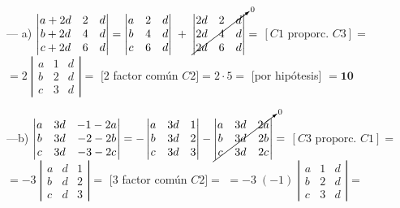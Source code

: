 \begin{proofw}\renewcommand{\qedsymbol}{$\diamond$}

--- a) $\left| \begin{matrix} a+2d&2&d\\b+2d&4&d\\c+2d&6&d  \end{matrix} \right|=\left| \begin{matrix} a&2&d\\b&4&d\\c&6&d  \end{matrix} \right|\;    + \; \cancelto{0}{ \left| \begin{matrix} 2d&2&d\\2d&4&d\\2d&6&d  \end{matrix} \right|}= $
\small{$[C1 \text{ proporc. } C3 ]$}\normalsize{$=$}
$=2\; \left| \begin{matrix} a&1&d\\b&2&d\\c&3&d  \end{matrix} \right| =$
\small{$[2$ factor común $C2]$}\normalsize{$=$}$2\cdot 5=$ \small{[por hipótesis]} \normalsize{$=\boldsymbol{10} $}

\noindent ---b) $\left| \begin{matrix} a&3d&-1-2a\\b&3d&-2-2b\\c&3d&-3-2c  \end{matrix} \right|=- \left| \begin{matrix} a&3d&1\\b&3d&2\\c&3d&3  \end{matrix} \right|
- \cancelto{0}{\left| \begin{matrix} a&3d&2a\\b&3d&2b\\c&3d&2c  \end{matrix} \right|} =$ \small{$[C3 \text{ proporc. } C1 ]$}\normalsize{$=$}
$=- 3\; \left| \begin{matrix} a&d&1\\b&d&2\\c&d&3  \end{matrix} \right|=$ 
\small{$[ 3$ factor común $C2]$}\normalsize{$=$} 
$=- 3\;(-1)\; \left| \begin{matrix} a&1&d\\b&2&d\\c&3&d \end{matrix} \right|=$ 


\end{proofw}

